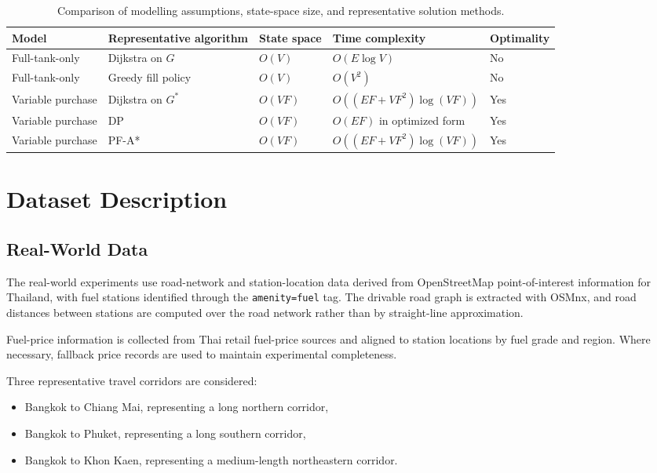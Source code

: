 \begin{table}[htbp]
\centering
\caption{Comparison of modelling assumptions, state-space size, and representative solution methods.}
\label{tab:model_comparison}
\small
\setlength{\tabcolsep}{5pt}
\renewcommand{\arraystretch}{1.15}
\begin{tabularx}{\linewidth}{@{}
>{\raggedright\arraybackslash}p{2.5cm}
>{\raggedright\arraybackslash}p{2.9cm}
>{\centering\arraybackslash}p{1.7cm}
>{\raggedright\arraybackslash}X
>{\centering\arraybackslash}p{1.6cm}
@{}}
\toprule
Model & Representative algorithm & State space & Time complexity & Optimality \\
\midrule
Full-tank-only & Dijkstra on $G$ & $O(V)$ & $O(E\log V)$ & No \\
Full-tank-only & Greedy fill policy & $O(V)$ & $O(V^{2})$ & No \\
Variable purchase & Dijkstra on $G^{*}$ & $O(VF)$ & $O((EF + VF^{2})\log(VF))$ & Yes \\
Variable purchase & DP & $O(VF)$ & $O(EF)$ in optimized form & Yes \\
Variable purchase & PF-A* & $O(VF)$ & $O((EF + VF^{2})\log(VF))$ & Yes \\
\bottomrule
\end{tabularx}
\end{table}

\section{Dataset Description}

\subsection{Real-World Data}

The real-world experiments use road-network and station-location data derived from OpenStreetMap point-of-interest information for Thailand, with fuel stations identified through the \texttt{amenity=fuel} tag. The drivable road graph is extracted with OSMnx, and road distances between stations are computed over the road network rather than by straight-line approximation.

Fuel-price information is collected from Thai retail fuel-price sources and aligned to station locations by fuel grade and region. Where necessary, fallback price records are used to maintain experimental completeness.

Three representative travel corridors are considered:
\begin{itemize}
    \item Bangkok to Chiang Mai, representing a long northern corridor,
    \item Bangkok to Phuket, representing a long southern corridor,
    \item Bangkok to Khon Kaen, representing a medium-length northeastern corridor.
\end{itemize}

